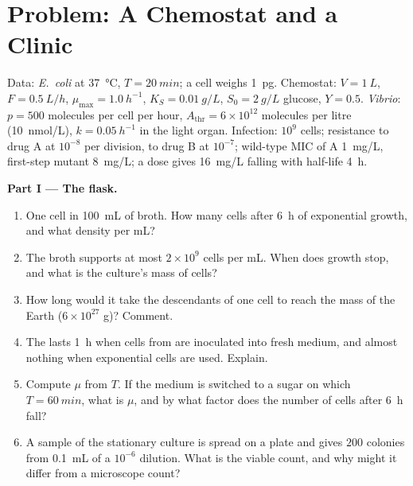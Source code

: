 \section{Problem: A Chemostat and a Clinic}

\begin{problem}
\label{pb:b3:bacteriology:1}
Data: \emph{E.~coli} at \qty{37}{\celsius}, $T = \qty{20}{min}$; a cell
weighs \qty{1}{pg}. Chemostat: $V = \qty{1}{L}$, $F = \qty{0.5}{L/h}$,
$\mu_{\max} = \qty{1.0}{h^{-1}}$, $K_{S} = \qty{0.01}{g/L}$, $S_{0} =
\qty{2}{g/L}$ glucose, $Y = 0.5$. \emph{Vibrio}: $p = 500$ 
molecules per cell per hour, $A_{\text{thr}} = 6\times 10^{12}$
molecules per litre (\qty{10}{nmol/L}), $k = \qty{0.05}{h^{-1}}$ in the
light organ. Infection: $10^{9}$ cells; resistance to drug A at
$10^{-8}$ per division, to drug B at $10^{-7}$; wild-type MIC of A
\qty{1}{mg/L}, first-step mutant \qty{8}{mg/L}; a dose gives
\qty{16}{mg/L} falling with half-life \qty{4}{h}.

\medskip
\noindent\textbf{Part I --- The flask.}
\begin{enumerate}
  \item One cell in \qty{100}{mL} of broth. How many cells after
        \qty{6}{h} of exponential growth, and what density per mL?
  \item The broth supports at most $2\times 10^{9}$ cells per mL. When
        does growth stop, and what is the culture's mass of cells?
  \item How long would it take the descendants of one cell to reach
        the mass of the Earth ($6\times 10^{27}$ g)? Comment.
  \item The  lasts \qty{1}{h} when cells from 
        are inoculated into fresh medium, and almost nothing when
        exponential cells are used. Explain.
  \item Compute $\mu$ from $T$. If the medium is switched to a sugar on
        which $T = \qty{60}{min}$, what is $\mu$, and by what factor
        does the number of cells after \qty{6}{h} fall?
  \item A sample of the stationary culture is spread on a plate and
        gives $200$ colonies from \qty{0.1}{mL} of a $10^{-6}$ dilution.
        What is the viable count, and why might it differ from a
        microscope count?
\end{enumerate}


\end{problem}
